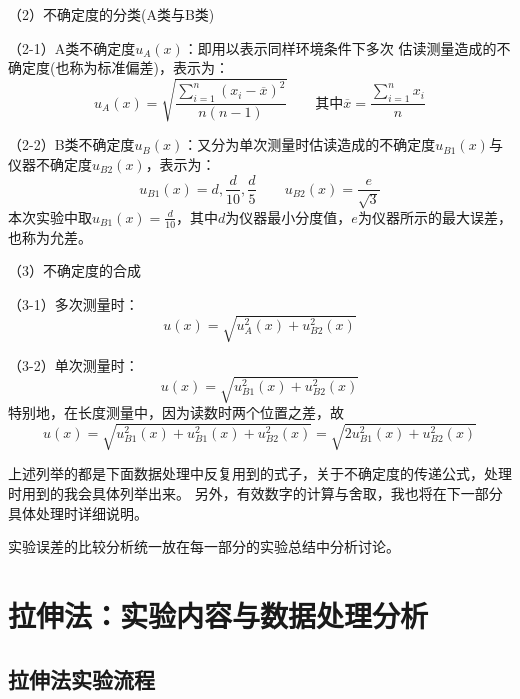 \documentclass[11pt]{article}
\begin{document}
\bigskip
\noindent（2）不确定度的分类(A类与B类)

（2-1）A类不确定度$u_A(x)$：即用以表示同样环境条件下多次
估读测量造成的不确定度(也称为标准偏差)，表示为：
\[
   u_A(x)=\sqrt{\frac{\sum_{i=1}^n(x_i-\overline x)^2}{n(n-1)}}\qquad \text{其中}\overline x=\frac{\sum_{i=1}^nx_i}{n} 
\]

（2-2）B类不确定度$u_B(x)$：又分为单次测量时估读造成的不确定度$u_{B1}(x)$与仪器不确定度$u_{B2}(x)$，表示为：
\[
   u_{B1}(x)=d,\frac{d}{10},\frac{d}{5}\qquad u_{B2}(x)=\frac{e}{\sqrt 3} 
\]
本次实验中取$u_{B1}(x)=\frac{d}{10}$，其中$d$为仪器最小分度值，$e$为仪器所示的最大误差，也称为允差。

\bigskip
\noindent （3）不确定度的合成

（3-1）多次测量时：
\[
   u(x)=\sqrt{u_A^2(x)+u^2_{B2}(x)} 
\]

（3-2）单次测量时：
\[
    u(x)=\sqrt{u_{B1}^2(x)+u^2_{B2}(x)} 
\]
特别地，在长度测量中，因为读数时两个位置之差，故\[
    u(x)=\sqrt{u_{B1}^2(x)+u_{B1}^2(x)+u^2_{B2}(x)} =\sqrt{2u_{B1}^2(x)+u^2_{B2}(x)} 
\]

上述列举的都是下面数据处理中反复用到的式子，关于不确定度的传递公式，处理时用到的我会具体列举出来。
另外，有效数字的计算与舍取，我也将在下一部分具体处理时详细说明。

实验误差的比较分析统一放在每一部分的实验总结中分析讨论。






































\section{拉伸法：实验内容与数据处理分析}

\subsection{拉伸法实验流程}
\end{document}
